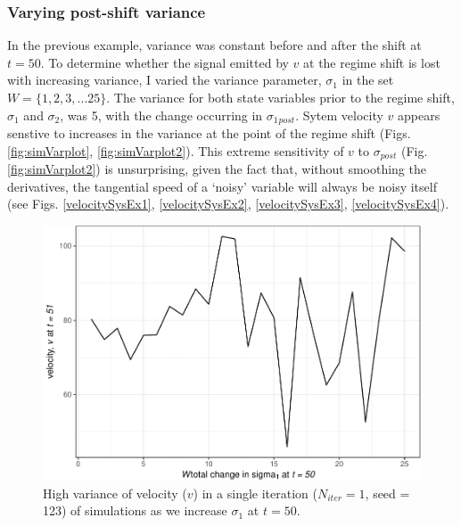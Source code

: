 \documentclass[12pt,twoside,openany]{reedthesis}
\begin{document}
\hypertarget{varying-post-shift-variance}{%
\subsubsection{Varying post-shift variance}\label{varying-post-shift-variance}}

In the previous example, variance was constant before and after the shift at \(t=50\). To determine whether the signal emitted by \(v\) at the regime shift is lost with increasing variance, I varied the variance parameter, \(\sigma_1\) in the set \(W = \{1,2,3,...25 \}\). The variance for both state variables prior to the regime shift, \(\sigma_1\) and \(\sigma_2\), was 5, with the change occurring in \(\sigma_1{_{post}}\). Sytem velocity \(v\) appears senstive to increases in the variance at the point of the regime shift (Figs. \ref{fig:simVarplot}, \ref{fig:simVarplot2}). This extreme sensitivity of \(v\) to \(\sigma{_{post}}\) (Fig. \ref{fig:simVarplot2}) is unsurprising, given the fact that, without smoothing the derivatives, the tangential speed of a `noisy' variable will always be noisy itself (see Figs. \ref{velocitySysEx1}, \ref{velocitySysEx2}, \ref{velocitySysEx3}, \ref{velocitySysEx4}).
\begin{figure}
\centering
\includegraphics{_myDissertation_files/figure-latex/simVarPlot-1.pdf}
\caption{\label{fig:simVarPlot}High variance of velocity (\(v\)) in a single iteration (\(N_{iter}=1\), seed = 123) of simulations as we increase \(\sigma_1\) at \(t=50\).}
\end{figure}
\end{document}
